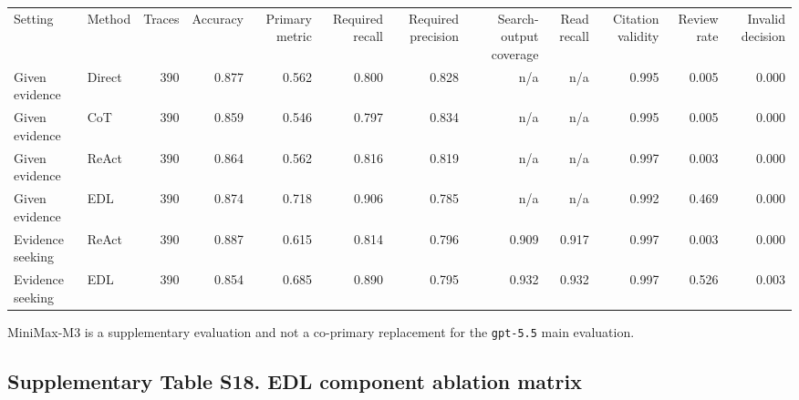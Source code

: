 \documentclass[
  8pt,
]{extarticle}
\begin{document}
\begin{center}
\begin{adjustbox}{max width=0.95\textwidth}
\begin{tabular}{@{}
llrrrrrrrrrr@{}}
\toprule\noalign{}
Setting & Method & Traces & Accuracy & Primary metric & Required recall
& Required precision & Search-output coverage & Read recall & Citation
validity & Review rate & Invalid decision \\

Given evidence & Direct & 390 & 0.877 & 0.562 & 0.800 & 0.828 & n/a &
n/a & 0.995 & 0.005 & 0.000 \\
Given evidence & CoT & 390 & 0.859 & 0.546 & 0.797 & 0.834 & n/a & n/a &
0.995 & 0.005 & 0.000 \\
Given evidence & ReAct & 390 & 0.864 & 0.562 & 0.816 & 0.819 & n/a & n/a
& 0.997 & 0.003 & 0.000 \\
Given evidence & EDL & 390 & 0.874 & 0.718 & 0.906 & 0.785 & n/a & n/a &
0.992 & 0.469 & 0.000 \\
Evidence seeking & ReAct & 390 & 0.887 & 0.615 & 0.814 & 0.796 & 0.909 &
0.917 & 0.997 & 0.003 & 0.000 \\
Evidence seeking & EDL & 390 & 0.854 & 0.685 & 0.890 & 0.795 & 0.932 &
0.932 & 0.997 & 0.526 & 0.003 \\
\bottomrule
\end{tabular}
\end{adjustbox}
\end{center}

MiniMax-M3 is a supplementary evaluation and not a co-primary
replacement for the \texttt{gpt-5.5} main evaluation.

\hypertarget{supplementary-table-s18-edl-component-ablation-matrix}{%
\subsection{Supplementary Table S18. EDL component ablation
matrix}\label{supplementary-table-s18-edl-component-ablation-matrix}}
\end{document}
